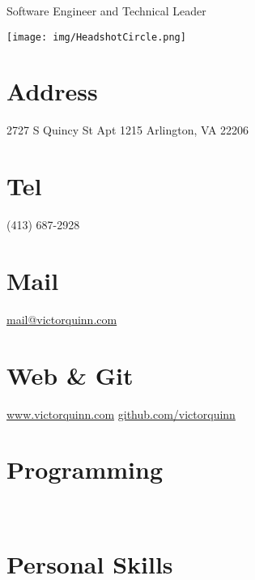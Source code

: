 \documentclass[]{friggeri-cv}
\begin{document}
      {Software Engineer and Technical Leader}
      

\begin{aside}
  \texttt{[image: img/HeadshotCircle.png]}
  \section{Address}
    2727 S Quincy St
    Apt 1215
    Arlington, VA 22206
    ~
  \section{Tel}
    (413) 687-2928
    ~
  \section{Mail}
    \href{mailto:mail@victorquinn.com}{{mail@victorquinn.com}}
    ~
  \section{Web \& Git}
    \href{https://www.victorquinn.com}{www.victorquinn.com}
    \href{https://github.com/victorquinn}{github.com/victorquinn}
    ~
  \section{Programming}
    ~
  \section{Personal Skills}
    ~
\end{aside}
~
\end{document}
